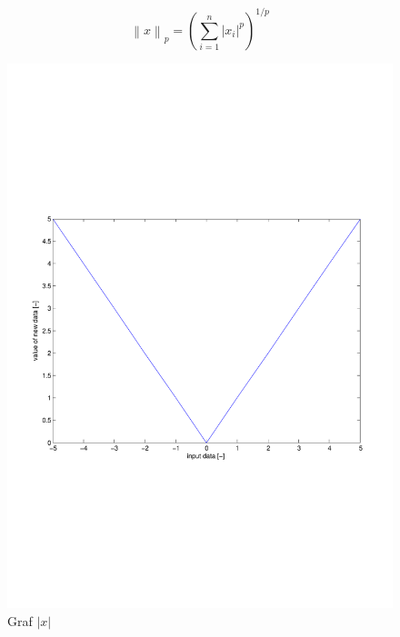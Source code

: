 \documentclass[FM,BP]{tulthesis}
\newcounter{Vzorce}
\begin{document}
\begin{equation} \label{eq:norma} \tag{Vzorec \theVzorce}
\left\|x\right\|_p = \left(\sum_{i=1}^{n} \left|x_i\right|^p\right)^{1/p}
\end{equation}

\begin{figure}[!ht]
\begin{center}
\includegraphics[scale=0.55]{obr/abs.pdf}
\end{center}
\caption{Graf $\left|x\right|$}
\label{fig:abs}
\end{figure}
\end{document}
